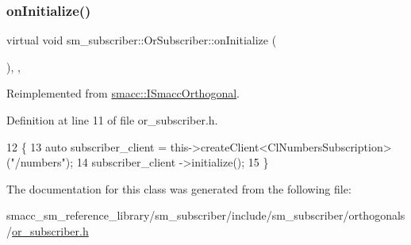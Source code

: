 \subsubsection{\texorpdfstring{on\+Initialize()}{onInitialize()}}
{\footnotesize\ttfamily virtual void sm\+\_\+subscriber\+::\+Or\+Subscriber\+::on\+Initialize (\begin{DoxyParamCaption}{ }\end{DoxyParamCaption})\hspace{0.3cm}{\ttfamily [inline]}, {\ttfamily [override]}, {\ttfamily [virtual]}}



Reimplemented from \hyperlink{classsmacc_1_1ISmaccOrthogonal_a6bb31c620cb64dd7b8417f8705c79c7a}{smacc\+::\+I\+Smacc\+Orthogonal}.



Definition at line 11 of file or\+\_\+subscriber.\+h.


\begin{DoxyCode}
12   \{
13     \textcolor{keyword}{auto} subscriber\_client = this->createClient<ClNumbersSubscription>(\textcolor{stringliteral}{"/numbers"});
14     subscriber\_client ->initialize();
15   \}
\end{DoxyCode}


The documentation for this class was generated from the following file\+:\begin{DoxyCompactItemize}
\item 
smacc\+\_\+sm\+\_\+reference\+\_\+library/sm\+\_\+subscriber/include/sm\+\_\+subscriber/orthogonals/\hyperlink{sm__subscriber_2include_2sm__subscriber_2orthogonals_2or__subscriber_8h}{or\+\_\+subscriber.\+h}\end{DoxyCompactItemize}
